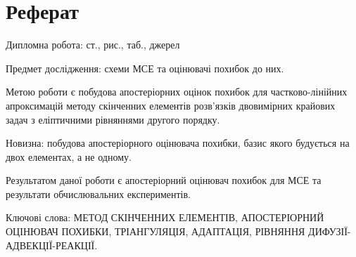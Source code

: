 
\section*{Реферат}

Дипломна робота: \pageref{LastPage} ст.,  рис.,  таб.,  джерел

Предмет дослідження: схеми МСЕ та оцінювачі похибок до них.

Метою роботи є побудова апостеріорних оцінок похибок для частково-лінійних апроксимацій методу скінченних елементів розв'язків двовимірних крайових задач з еліптичними рівняннями другого порядку.

Новизна: побудова апостеріорного оцінювача похибки, базис якого будується на двох елементах, а не одному.

Результатом даної роботи є апостеріорний оцінювач похибок для МСЕ та результати обчислювальних експериментів.

Ключові слова: \MakeTextUppercase{метод скінченних елементів, апостеріорний оцінювач похибки, тріангуляція, адаптація, рівняння дифузії-адвекції-реакції}.

